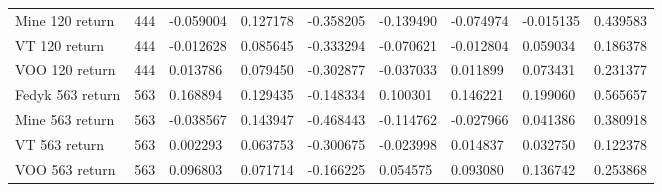 \begin{appendices}
\begin{table}[ht]
\begin{adjustbox}{width=\textwidth}
\begin{tabular}{@{}l|llllllll@{}}
    Mine 120 return      & 444                                & -0.059004                         & 0.127178                         & -0.358205                        & -0.139490                         & -0.074974                         & -0.015135                         & 0.439583                         \\
    VT 120 return             & 444                               & -0.012628                          & 0.085645                         & -0.333294                        & -0.070621                         & -0.012804                         & 0.059034                          & 0.186378                         \\
    VOO 120 return            & 444                               & 0.013786                           & 0.079450                         & -0.302877                        & -0.037033                         & 0.011899                          & 0.073431                          & 0.231377                         \\
    Fedyk 563 return     & 563                                & 0.168894                          & 0.129435                         & -0.148334                        & 0.100301                          & 0.146221                          & 0.199060                          & 0.565657                         \\
    Mine 563 return      & 563                                & -0.038567                         & 0.143947                         & -0.468443                        & -0.114762                         & -0.027966                         & 0.041386                          & 0.380918                         \\
    VT 563 return             & 563                               & 0.002293                           & 0.063753                         & -0.300675                        & -0.023998                         & 0.014837                          & 0.032750                          & 0.122378                         \\
    VOO 563 return            & 563                               & 0.096803                           & 0.071714                         & -0.166225                        & 0.054575                          & 0.093080                          & 0.136742                          & 0.253868
    \end{tabular}
\end{adjustbox}
\label{tab:returns_stocks}
\end{table}


\end{appendices}

